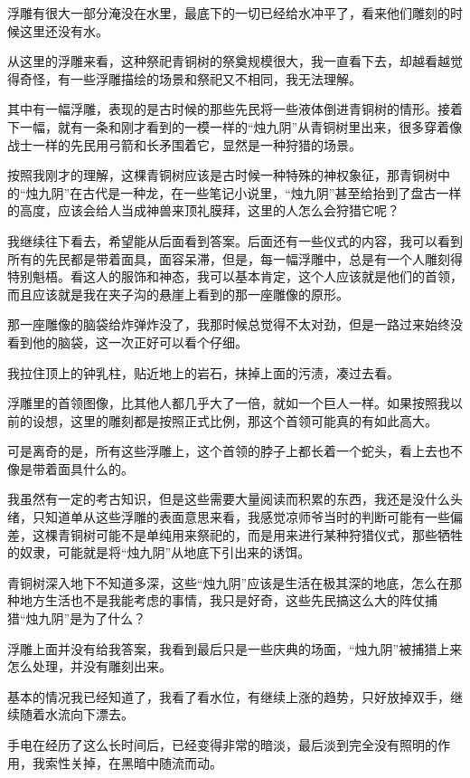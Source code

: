 浮雕有很大一部分淹没在水里，最底下的一切已经给水冲平了，看来他们雕刻的时候这里还没有水。

从这里的浮雕来看，这种祭祀青铜树的祭奠规模很大，我一直看下去，却越看越觉得奇怪，有一些浮雕描绘的场景和祭祀又不相同，我无法理解。

其中有一幅浮雕，表现的是古时候的那些先民将一些液体倒进青铜树的情形。接着下一幅，就有一条和刚才看到的一模一样的“烛九阴”从青铜树里出来，很多穿着像战士一样的先民用弓箭和长矛围着它，显然是一种狩猎的场景。

按照我刚才的理解，这棵青铜树应该是古时候一种特殊的神权象征，那青铜树中的“烛九阴”在古代是一种龙，在一些笔记小说里，“烛九阴”甚至给抬到了盘古一样的高度，应该会给人当成神兽来顶礼膜拜，这里的人怎么会狩猎它呢？

我继续往下看去，希望能从后面看到答案。后面还有一些仪式的内容，我可以看到所有的先民都是带着面具，面容呆滞，但是，每一幅浮雕中，总是有一个人雕刻得特别魁梧。看这人的服饰和神态，我可以基本肯定，这个人应该就是他们的首领，而且应该就是我在夹子沟的悬崖上看到的那一座雕像的原形。

那一座雕像的脑袋给炸弹炸没了，我那时候总觉得不太对劲，但是一路过来始终没看到他的脑袋，这一次正好可以看个仔细。

我拉住顶上的钟乳柱，贴近地上的岩石，抹掉上面的污渍，凑过去看。

浮雕里的首领图像，比其他人都几乎大了一倍，就如一个巨人一样。如果按照我以前的设想，这里的雕刻都是按照正式比例，那这个首领可能真的有如此高大。

可是离奇的是，所有这些浮雕上，这个首领的脖子上都长着一个蛇头，看上去也不像是带着面具什么的。

我虽然有一定的考古知识，但是这些需要大量阅读而积累的东西，我还是没什么头绪，只知道单从这些浮雕的表面意思来看，我感觉凉师爷当时的判断可能有一些偏差，这棵青铜树可能不是单纯用来祭祀的，而是用来进行某种狩猎仪式，那些牺牲的奴隶，可能就是将“烛九阴”从地底下引出来的诱饵。

青铜树深入地下不知道多深，这些“烛九阴”应该是生活在极其深的地底，怎么在那种地方生活也不是我能考虑的事情，我只是好奇，这些先民搞这么大的阵仗捕猎“烛九阴”是为了什么？

浮雕上面并没有给我答案，我看到最后只是一些庆典的场面，“烛九阴”被捕猎上来怎么处理，并没有雕刻出来。

基本的情况我已经知道了，我看了看水位，有继续上涨的趋势，只好放掉双手，继续随着水流向下漂去。

手电在经历了这么长时间后，已经变得非常的暗淡，最后淡到完全没有照明的作用，我索性关掉，在黑暗中随流而动。

